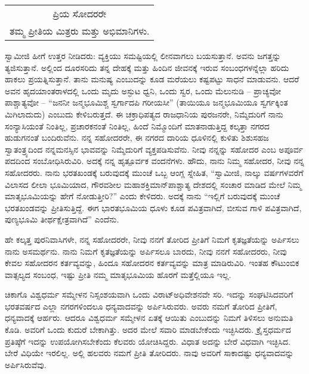 \vskip 4pt

\begin{longtable}[r]{@{}c@{}}
ಪ್ರಿಯ ಸೋದರರೇ \\
ತಮ್ಮ ಪ್ರೀತಿಯ ಮಿತ್ರರು ಮತ್ತು ಅಭಿಮಾನಿಗಳು. \\
\end{longtable}

\vskip 2pt

ಸ್ವಾಮೀಜಿ ಹೀಗೆ ಉತ್ತರ ನೀಡಿದರು: ವ್ಯಕ್ತಿಯು ಸಮಷ್ಟಿಯಲ್ಲಿ ಲೀನವಾಗಲು ಬಯಸುತ್ತಾನೆ. ಅವನು ಜಗತ್ತನ್ನು ತ್ಯಜಿಸುತ್ತಾನೆ. ಅಲ್ಲಿಂದ ದೂರಸರಿದು ತನ್ನ ದೇಹಕ್ಕೆ ಮತ್ತು ಹಿಂದಿನ ಜೀವನಕ್ಕೆ ಇರುವ ಸಂಬಂಧಗಳನ್ನೆಲ್ಲಾ ಹರಿದು ಹಾಕಲು ಪ್ರಯತ್ನಿಸುತ್ತಾನೆ. ತಾನು ಮನುಷ್ಯ ಎಂಬುದನ್ನು ಕೂಡ ಮರೆಯಲು ಕಷ್ಟಪಟ್ಟು ಸಾಧನೆ ಮಾಡುವನು. ಆದರೆ ಅವನ ಹೃದಯಾಂತರಾಳದಲ್ಲಿ ಒಂದು ಮೃದು ಅಸ್ಫುಟ ಧ್ವನಿ, ಒಂದು ಸ್ವರ, ಒಂದು ಮೆಲುನುಡಿ – ಪ್ರಾಚ್ಯವೋ ಪಾಶ್ಚಾತ್ಯವೋ – “ಜನನೀ ಜನ್ಮಭೂಮಿಶ್ಚ ಸ್ವರ್ಗಾದಪಿ ಗರೀಯಸೀ” (ತಾಯಿಯೂ ಜನ್ಮಭೂಮಿಯೂ ಸ್ವರ್ಗಕ್ಕಿಂತ ಮಿಗಿಲಾದುದು) ಎಂಬುದು ಕೇಳಿಬರುತ್ತದೆ. ಈ ಚಕ್ರಾಧಿಪತ್ಯದ ರಾಜಧಾನಿಯ ಪುರಜನರೇ, ನಿಮ್ಮೆದುರಿಗೆ ನಾನು ಸಂನ್ಯಾಸಿಯಂತೆ ನಿಂತಿಲ್ಲ, ಪ್ರಚಾರಕನಂತೆ ನಿಂತಿಲ್ಲ, ಹಿಂದೆ ನಿಮ್ಮೊಂದಿಗೆ ಮಾತನಾಡುತ್ತಿದ್ದ ಕಲ್ಕತ್ತಾ ನಗರದ ಹುಡುಗನಂತೆ ಬಂದಿರುವೆನು. ನನ್ನ ಸಹೋದರರೇ, ಈ ನಗರದ ದಾರಿಯ ಧೂಳಿನಲ್ಲಿ ಕುಳಿತು ಶಿಶುಸಹಜ ಸ್ವಾತಂತ್ರ್ಯದಿಂದ ನನ್ನ\break ಮನಸ್ಸಿನ ಭಾವವನ್ನು ನಿಮ್ಮೆದುರಿಗೆ ವ್ಯಕ್ತಪಡಿಸುವೆನು. ನೀವು ನನ್ನನ್ನು ಸಹೋದರ ಎಂಬ ಅಪೂರ್ವ ಪದದಿಂದ ಸಂಬೋಧಿಸಿರುವಿರಿ. ಅದಕ್ಕೆ ನನ್ನ ಹೃತ್ಪೂರ್ವಕ ವಂದನೆಗಳು. ಹೌದು, ನಾನು ನಿಮ್ಮ ಸಹೋದರ, ನೀವು ನನ್ನ ಸಹೋದರರು. ನಾನು ಭರತಖಂಡಕ್ಕೆ ಬರುವುದಕ್ಕೆ ಮುಂಚೆ ಒಬ್ಬ ಆಂಗ್ಲ ಸ್ನೇಹಿತ, “ಸ್ವಾಮೀಜಿ, ನಾಲ್ಕು ವರ್ಷಗಳವರೆಗೆ ವಿಲಾಸದ ಲೀಲಾ ಭೂಮಿಯಾದ, ಗೌರವಶೀಲ ಮಹಾಶಕ್ತಿಮಾನ್​ ಪಾಶ್ಚಾತ್ಯ ದೇಶದಲ್ಲಿ ಸಂಚಾರ ಮಾಡಿದ ಮೇಲೆ ನಿಮ್ಮ ಮಾತೃಭೂಮಿಯನ್ನು ಹೇಗೆ ನೋಡುತ್ತೀರಿ?” ಎಂದು ಕೇಳಿದರು. ಅದಕ್ಕೆ ನಾನು “ಇಲ್ಲಿಗೆ ಬರುವುದಕ್ಕೆ ಮುಂಚೆ ಭರತಖಂಡವನ್ನು ಪ್ರೀತಿಸುತ್ತಿದ್ದೆ. ಈಗ ಭಾರತಭೂಮಿಯ ಧೂಳು ಕೂಡ ಪವಿತ್ರವಾಗಿದೆ, ಬೀಸುವ ಗಾಳಿ ಪವಿತ್ರವಾಗಿದೆ, ಪುಣ್ಯಭೂಮಿ ತೀರ್ಥಕ್ಷೇತ್ರವಾಗಿದೆ” ಎಂದೆನು.

ಹೇ ಕಲ್ಕತ್ತ ಪುರನಿವಾಸಿಗಳೇ, ನನ್ನ ಸಹೋದರರೇ, ನೀವು ನನಗೆ ತೋರಿದ ಪ್ರೀತಿಗೆ ನಿಮಗೆ ಕೃತಜ್ಞತೆಯನ್ನು ಅರ್ಪಿಸಲು ನಾನು ಅಸಮರ್ಥನು. ನಾನು ನಿಮಗೆ ಕೃತಜ್ಞತೆಯನ್ನು ಅರ್ಪಿಸಲೂ ಬಾರದು, ನೀವು ನನಗೆ ಸಹೋದರರು, ನೀವು ಕೇವಲ ಸಹೋದರನ ಕರ್ತವ್ಯವನ್ನು, ಹಿಂದೂ ಸಹೋದರನ ಕರ್ತವ್ಯವನ್ನು ಮಾತ್ರ ಮಾಡಿರುವಿರಿ. ಇಂತಹ ಕೌಟುಂಬಿಕ ವಾತ್ಸಲ್ಯದ ಸಂಬಂಧ, ಇಷ್ಟು ಪ್ರೀತಿ ನಮ್ಮ ಮಾತೃಭೂಮಿಯ ಹೊರಗೆ ಮತ್ತೆಲ್ಲಿಯೂ ಇಲ್ಲ.

ಚಿಕಾಗೊ ವಿಶ್ವಧರ್ಮ ಸಮ್ಮೇಳನ ನಿಸ್ಸಂಶಯವಾಗಿ ಒಂದು ವಿರಾಟ್​\break ಅಧಿವೇಶನವೇ ಸರಿ. ಇದನ್ನು ಸಂಘಟಿಸಿದವರಿಗೆ ಭರತವರ್ಷದ ಎಲ್ಲಾ ನಗರಗಳಿಂದಲೂ ಧನ್ಯವಾದವನ್ನು ಅರ್ಪಿಸಿರುವರು. ಅವರು ನಮಗೆ ತೋರಿದ ಪ್ರೀತಿಗೆ, ಧನ್ಯವಾದಕ್ಕೆ ಆರ್ಹರು. ಆದರೂ ವಿಶ್ವಧರ್ಮ ಸಮ್ಮೇಳನ ಏತಕ್ಕೆ ಆಯಿತು ಎಂಬುದನ್ನು ನಿಮಗೆ ತಿಳಿಸಲು ಅನುಮತಿ ಕೊಡಿ. ಅವರಿಗೆ ಒಂದು ಕುದುರೆ ಬೇಕಾಗಿತ್ತು. ಅದರ ಮೇಲೆ ಸವಾರಿ ಮಾಡಬೇಕೆಂದು ಇಚ್ಛಿಸಿದರು. ಕ್ರೈಸ್ತಧರ್ಮದ ಪ್ರತಿಷ್ಠೆಗೆ ಇದನ್ನು ಉಪಯೋಗಿಸಬೇಕೆಂದು ಕೆಲವರು ಯೋಚಿಸಿದ್ದರು. ವಿಧಾತ ಅದನ್ನು ಬೇರೆ ವಿಧವಾಗಿ ಇಚ್ಛಿಸಿದ. ಬೇರೆ ವಿಧಿಯೇ ಇರಲಿಲ್ಲ. ಅಲ್ಲಿ ಹಲವರು ನಮಗೆ ಪ್ರೀತಿ ತೋರಿದರು. ನಾವು ಅವರಿಗೆ ಸಾಕಾದಷ್ಟು ಧನ್ಯವಾದವನ್ನು ಅರ್ಪಿಸಿರುವೆವು.


